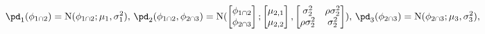\begin{equation}
  \pd_{1}(\phi_{1 \cap 2}) = \text{N}(\phi_{1 \cap 2}; \mu_{1}, \sigma_{1}^{2}),
  \,
  \pd_{2}(\phi_{1 \cap 2}, \phi_{2 \cap 3}) = \text{N}(
    \begin{bmatrix} \phi_{1 \cap 2} \\ \phi_{2 \cap 3} \end{bmatrix};
    \begin{bmatrix} \mu_{2, 1} \\ \mu_{2, 2} \end{bmatrix},
    \begin{bmatrix} \sigma_{2}^{2} & \rho \sigma_{2}^{2} \\ \rho \sigma_{2}^{2} & \sigma_{2}^{2} \end{bmatrix}
  ),
  \,
  \pd_{3}(\phi_{2 \cap 3}) = \text{N}(\phi_{2 \cap 3}; \mu_{3}, \sigma_{3}^{2}),
  \label{eqn:marginal-gaussian-example}
\end{equation}